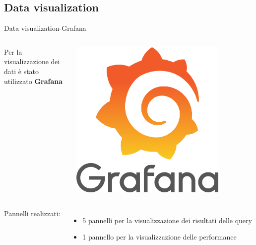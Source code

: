 \documentclass[13pt,aspectratio=169,t,xcolor=table]{beamer}
\begin{document}
\subsection{Data visualization}
\begin{frame}{Data visualization-Grafana}
    \begin{columns}
            Per la visualizzazione dei dati è stato utilizzato \textbf{Grafana}
            \begin{minipage}{0.5\textwidth}
                \raggedleft
                \includegraphics[width=0.8\textwidth]{res/grafana_icon.png}
            \end{minipage}
    \end{columns}
    \vspace{0.5cm}
    \begin{columns}
            \begin{minipage}[b]{1\textwidth}
                Pannelli realizzati:
                \begin{itemize}
                    \item 5 pannelli per la visualizzazione dei risultati delle query
                    \item 1 pannello per la visualizzazione delle performance
                \end{itemize}
            \end{minipage}
            \begin{minipage}{1\textwidth}

\end{minipage}
\end{columns}
\end{frame}
\end{document}
